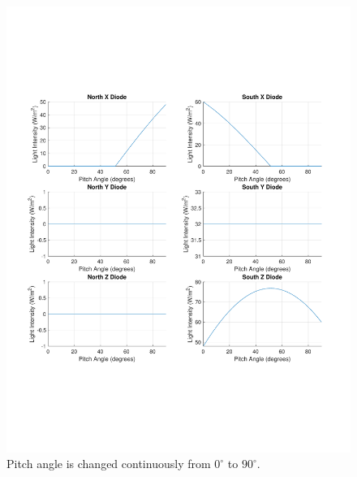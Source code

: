 \documentclass[10pt, letterpaper]{article}
\begin{document}
\begin{figure}[H]
	\centering
	\includegraphics[scale=0.8]{PitchAngle_DiodeResponse.pdf}
    \caption{Pitch angle is changed continuously from $0^{\circ}$ to $90^{\circ}$.}
    \label{fig:PitchAngleChange}
\end{figure}
\end{document}
